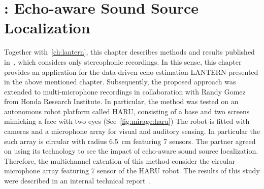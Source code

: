 \chapter{: Echo-aware Sound Source Localization}\label{ch:mirage}


 \synopsisChMirage

\mynewline
Together with~\cref{ch:lantern}, this chapter describes methods and results published in~\cite{di2019mirage}, which considers only stereophonic recordings.
In this sense, this chapter provides an application for the data-driven echo estimation \ac{LANTERN} presented in the above mentioned chapter.
Subsequently, the proposed approach was extended to multi-microphone recordings in collaboration with Randy Gomez from Honda Research Institute.
In particular, the method was tested on an autonomous robot platform called HARU, consisting of a base and two screens mimicking a face with two eyes (See~\cref{fig:mirage:haru})
The robot is fitted with cameras and a microphone array for visual and auditory sensing.
In particular the such array is circular with radius 6.5~cm featuring 7 sensors.
The partner agreed on using its technology to see the impact of echo-aware sound source localization.
Therefore, the multichannel extention of this method consider the circular microphone array featuring 7 sensor of the HARU robot.
The results of this study were described in an internal technical report~.


